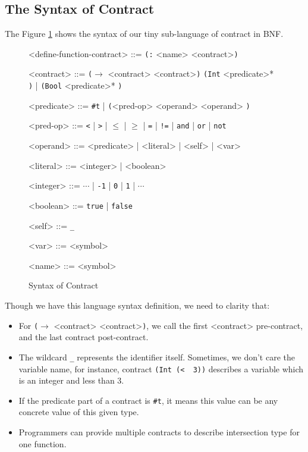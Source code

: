\documentclass[paper=a4, fontsize=11pt]{scrartcl} %
\numberwithin{equation}{section} %
\numberwithin{figure}{section} %
\numberwithin{table}{section} %
\begin{document}
\subsection{The Syntax of Contract}
The Figure \ref{figc} shows the syntax of our tiny sub-language of contract in BNF.
\begin{figure}[h!]
\setlength{\grammarparsep}{7pt plus 1pt minus 1pt} %
\setlength{\grammarindent}{8em} %
\begin{grammar}
<define-function-contract> ::= \texttt{(:} <name> <contract>\texttt{)}

<contract> ::= \texttt{($\rightarrow$} <contract> <contract>\texttt{)}
\alt \texttt{(Int} <predicate>* \texttt{)} | \texttt{(Bool} <predicate>* \texttt{)}

<predicate> ::= \texttt{\#t} | \texttt{(}<pred-op> <operand> <operand> \texttt{)}

<pred-op> ::= \texttt{\textless} | \texttt{\textgreater} | \texttt{$\leq$} | \texttt{$\geq$} | \texttt{=} | \texttt{!=} | \texttt{and} | \texttt{or} | \texttt{not}

<operand> ::= <predicate> | <literal> | <self> | <var>

<literal> ::= <integer> | <boolean>

<integer> ::= $\cdots$ | \texttt{-1} | \texttt{0} | \texttt{1} | $\cdots$

<boolean> ::= \texttt{true} | \texttt{false}

<self> ::= \texttt{_}

<var> ::= <symbol>

<name> ::= <symbol>
\end{grammar}
\caption{Syntax of Contract}
\label{figc}
\end{figure}

Though we have this language syntax definition, we need to clarity that:
\begin{itemize}
\item For \texttt{($\rightarrow$} <contract> <contract>\texttt{)}, we call the first <contract> pre-contract, and the last contract post-contract.

\item The wildcard \texttt{_} represents the identifier itself. Sometimes, we don't care the variable name, for instance, contract \texttt{(Int\ (\textless\ \underscore\ 3))} describes a variable which is an integer and less than 3.

\item If the predicate part of a contract is \texttt{\#t}, it means this value can be any concrete value of this given type.

\item Programmers can provide multiple contracts to describe intersection type for one function.
\end{itemize}
\end{document}
